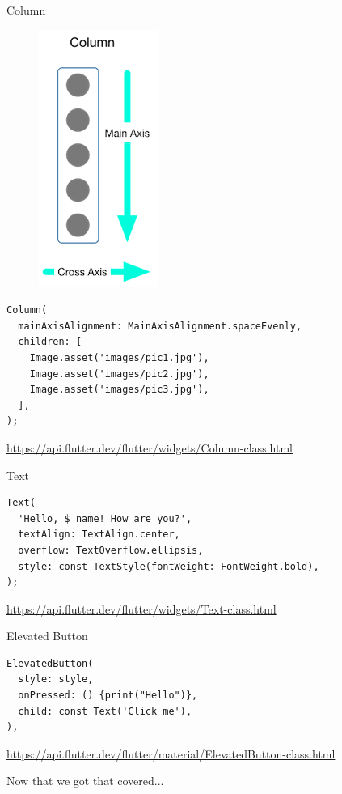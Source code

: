 \begin{frame}[containsverbatim]{Column}

  \begin{figure}[h]
    \includegraphics[height=0.25\textwidth]{images/column-diagram.png}
  \end{figure}

  \begin{verbatim}
Column(
  mainAxisAlignment: MainAxisAlignment.spaceEvenly,
  children: [
    Image.asset('images/pic1.jpg'),
    Image.asset('images/pic2.jpg'),
    Image.asset('images/pic3.jpg'),
  ],
);
  \end{verbatim}
  \footnotesize
  \url{https://api.flutter.dev/flutter/widgets/Column-class.html}
\end{frame}

\begin{frame}[containsverbatim]{Text}

  \begin{verbatim}
Text(
  'Hello, $_name! How are you?',
  textAlign: TextAlign.center,
  overflow: TextOverflow.ellipsis,
  style: const TextStyle(fontWeight: FontWeight.bold),
);
	\end{verbatim}
  \footnotesize
  \url{https://api.flutter.dev/flutter/widgets/Text-class.html}
\end{frame}

\begin{frame}[containsverbatim]{Elevated Button}

  \begin{verbatim}
ElevatedButton(
  style: style,
  onPressed: () {print("Hello")},
  child: const Text('Click me'),
),
	\end{verbatim}
  \footnotesize
  \url{https://api.flutter.dev/flutter/material/ElevatedButton-class.html}
\end{frame}

\begin{frame}
  Now that we got that covered...
\end{frame}